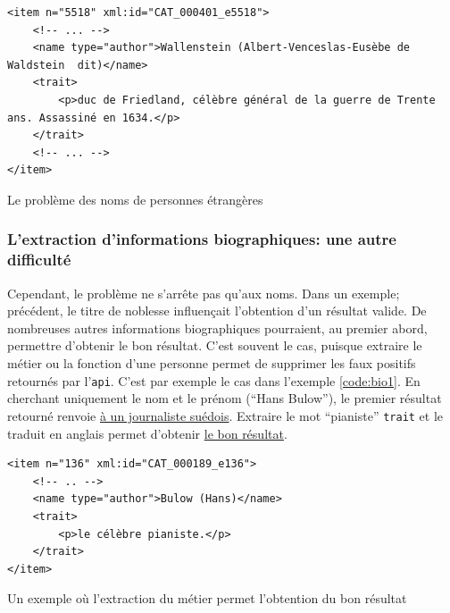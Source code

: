\documentclass[a4paper, 12pt, twoside]{book}
\newenvironment{code}{\captionsetup{type=listing}}{}
\newcommand{\api}{\texttt{\gls{api}}}
\newcommand{\ttrait}{\texttt{trait}}
\begin{document}
\begin{code}
	\begin{verbatim}
<item n="5518" xml:id="CAT_000401_e5518">
	<!-- ... -->
	<name type="author">Wallenstein (Albert-Venceslas-Eusèbe de Waldstein  dit)</name>
	<trait>
		<p>duc de Friedland, célèbre général de la guerre de Trente ans. Assassiné en 1634.</p>
	</trait>
	<!-- ... -->
</item>
	\end{verbatim}
	\caption{Le problème des noms de personnes étrangères}
	\label{code:name3}
\end{code}

\subsubsection{L'extraction d'informations biographiques: une autre difficulté}
Cependant, le problème ne s'arrête pas qu'aux noms. Dans un exemple; précédent, le titre de noblesse influençait l'obtention d'un résultat valide. De nombreuses autres informations biographiques pourraient, au premier abord, permettre d'obtenir le bon résultat. C'est souvent le cas, puisque extraire le métier ou la fonction d'une personne permet de supprimer les faux positifs retournés par l'\api{}. C'est par exemple le cas dans l'exemple \ref{code:bio1}. En cherchant uniquement le nom et le prénom (\enquote{Hans Bulow}), le premier résultat retourné renvoie \href{https://www.wikidata.org/w/index.php?search=hans+bulow&title=Special:Search&profile=advanced&fulltext=1&ns0=1&ns120=1}{à un journaliste suédois}. Extraire le mot \enquote{pianiste} \ttrait{} et le traduit en anglais permet d'obtenir \href{https://www.wikidata.org/w/index.php?search=hans+bulow+pianist&title=Special:Search&profile=advanced&fulltext=1&ns0=1&ns120=1}{le bon résultat}.

\begin{code}
	\begin{verbatim}
<item n="136" xml:id="CAT_000189_e136">
	<!-- .. -->
	<name type="author">Bulow (Hans)</name>
	<trait>
		<p>le célèbre pianiste.</p>
	</trait>
</item>
	\end{verbatim}
	\label{code:bio1}
	\caption{Un exemple où l'extraction du métier permet l'obtention du bon résultat}
\end{code}
\end{document}
